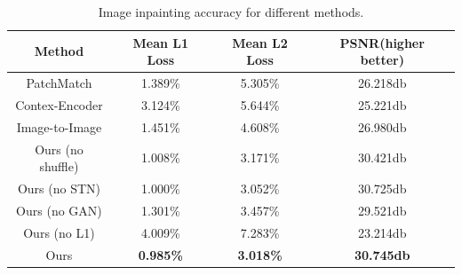 \documentclass{IEEE_lsens}
\begin{document}
\begin{table}[htbp]
  \caption{Image inpainting accuracy for different methods.}
  \centering
  \begin{tabular}{c|c|c|c}
    \hline
    \bf{Method}             &   \bf{Mean L1 Loss}     &   \bf{Mean L2 Loss}   &   \bf{PSNR}(higher better)   \\
    \hline
    \hline
    PatchMatch       	 &  1.389\%         &  5.305\%          &  26.218db              \\
    \hline
    Contex-Encoder       &  3.124\%         &  5.644\%          &  25.221db              \\
    \hline
    Image-to-Image       &  1.451\%         &  4.608\%          &  26.980db              \\
    \hline
    Ours (no shuffle)    &  1.008\%         &  3.171\%          &  30.421db              \\
    \hline
    Ours (no STN)        &  1.000\%         &  3.052\%          &  30.725db              \\
    \hline
    Ours (no GAN)        &  1.301\%         &  3.457\%          &  29.521db             \\
    \hline
    Ours (no L1)         &  4.009\%         &  7.283\%          &  23.214db             \\
    \hline
    Ours                 & \bf{0.985\%}     &  \bf{3.018\%}     &  \bf{30.745db}              \\
    \hline
  \end{tabular}
  \label{resultTable}
\end{table}

\end{document}
